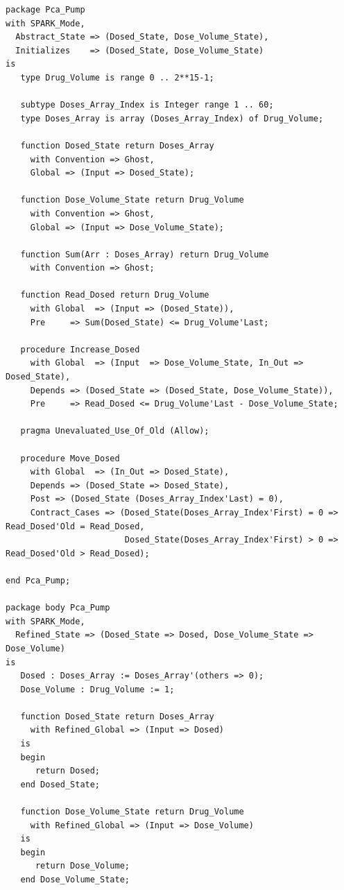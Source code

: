 \singlespacing
\begin{lstlisting}[language=ada2012, frame=single, gobble=0, caption={Sequential module for dose monitoring in SPARK 2014}, label={listing:pca_pump_move_dosed_unit_spark2014}]
package Pca_Pump
with SPARK_Mode,
  Abstract_State => (Dosed_State, Dose_Volume_State),
  Initializes    => (Dosed_State, Dose_Volume_State)
is
   type Drug_Volume is range 0 .. 2**15-1;

   subtype Doses_Array_Index is Integer range 1 .. 60;
   type Doses_Array is array (Doses_Array_Index) of Drug_Volume;

   function Dosed_State return Doses_Array
     with Convention => Ghost,
     Global => (Input => Dosed_State);

   function Dose_Volume_State return Drug_Volume
     with Convention => Ghost,
     Global => (Input => Dose_Volume_State);

   function Sum(Arr : Doses_Array) return Drug_Volume
     with Convention => Ghost;

   function Read_Dosed return Drug_Volume
     with Global  => (Input => (Dosed_State)),
     Pre     => Sum(Dosed_State) <= Drug_Volume'Last;

   procedure Increase_Dosed
     with Global  => (Input  => Dose_Volume_State, In_Out => Dosed_State),
     Depends => (Dosed_State => (Dosed_State, Dose_Volume_State)),
     Pre     => Read_Dosed <= Drug_Volume'Last - Dose_Volume_State;

   pragma Unevaluated_Use_Of_Old (Allow);

   procedure Move_Dosed
     with Global  => (In_Out => Dosed_State),
     Depends => (Dosed_State => Dosed_State),
     Post => (Dosed_State (Doses_Array_Index'Last) = 0),
     Contract_Cases => (Dosed_State(Doses_Array_Index'First) = 0 => Read_Dosed'Old = Read_Dosed,
                        Dosed_State(Doses_Array_Index'First) > 0 => Read_Dosed'Old > Read_Dosed);
     
end Pca_Pump;

package body Pca_Pump
with SPARK_Mode,
  Refined_State => (Dosed_State => Dosed, Dose_Volume_State => Dose_Volume)
is
   Dosed : Doses_Array := Doses_Array'(others => 0);
   Dose_Volume : Drug_Volume := 1;

   function Dosed_State return Doses_Array
     with Refined_Global => (Input => Dosed)
   is
   begin
      return Dosed;
   end Dosed_State;

   function Dose_Volume_State return Drug_Volume
     with Refined_Global => (Input => Dose_Volume)
   is
   begin
      return Dose_Volume;
   end Dose_Volume_State;


\end{lstlisting}
